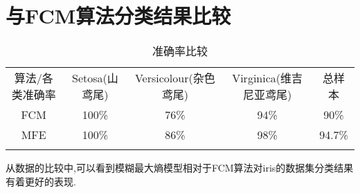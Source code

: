 \section{与FCM算法分类结果比较}
\begin{table}[!ht]
    \label{准确率比较}
    \caption{准确率比较}
    \centering
    \begin{tabular}{c | c c c c}
        \whline 算法/各类准确率 & Setosa(山鸢尾) & Versicolour(杂色鸢尾) & Virginica(维吉尼亚鸢尾) & 总样本 \\\whline
        FCM                     & 100\%          & 76\%                  & 94\%                    & 90\%   \\
        MFE                     & 100\%          & 86\%                  & 98\%                    & 94.7\% \\
        \whline
    \end{tabular}
\end{table}
从数据的比较中,可以看到模糊最大熵模型相对于FCM算法对iris的数据集分类结果有着更好的表现.